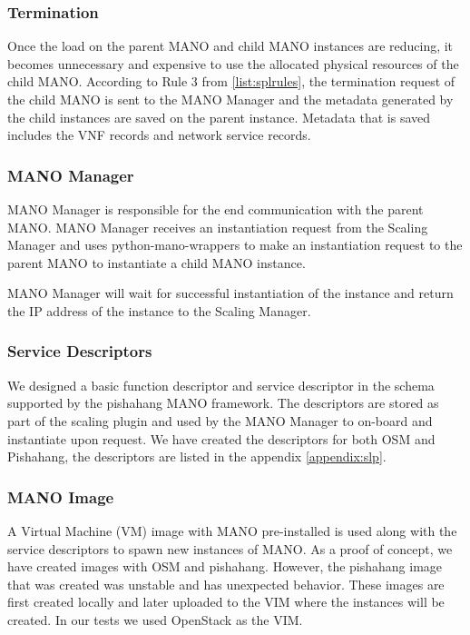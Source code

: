 \subsubsection*{Termination}

Once the load on the parent MANO and child MANO instances are reducing, it becomes unnecessary and expensive to use the allocated physical resources of the child MANO. According to Rule 3 from \ref{list:splrules}, the termination request of the child MANO is sent to the MANO Manager and the metadata generated by the child instances are saved on the parent instance. Metadata that is saved includes the VNF records and network service records.


\subsubsection{MANO Manager}
MANO Manager is responsible for the end communication with the parent MANO. MANO Manager receives an instantiation request from the Scaling Manager and uses python-mano-wrappers to make an instantiation request to the parent MANO to instantiate a child MANO instance. 

MANO Manager will wait for successful instantiation of the instance and return the IP address of the instance to the Scaling Manager.

\subsubsection*{Service Descriptors}

We designed a basic function descriptor and service descriptor in the schema supported by the pishahang MANO framework. The descriptors are stored as part of the scaling plugin and used by the MANO Manager to on-board and instantiate upon request. We have created the descriptors for both OSM and Pishahang, the descriptors are listed in the appendix \ref{appendix:slp}. 

\subsubsection*{MANO Image}

A Virtual Machine (VM) image with MANO pre-installed is used along with the service descriptors to spawn new instances of MANO. As a proof of concept, we have created images with OSM and pishahang. However, the pishahang image that was created was unstable and has unexpected behavior. These images are first created locally and later uploaded to the VIM where the instances will be created. In our tests we used OpenStack as the VIM.

